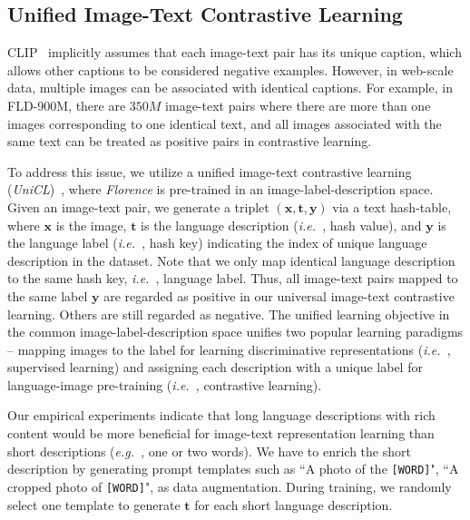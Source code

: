 \documentclass{article}
\newcommand{\eg}{{\it{e.g.}~}}
\newcommand{\ie}{{\it{i.e.}~}}
\begin{document}
\subsection{Unified Image-Text Contrastive Learning}
\label{sect:UniC}

CLIP~\cite{radford2021learning} implicitly assumes that each image-text pair has its unique caption, which allows other captions to be considered negative examples. However, in web-scale data, multiple images can be associated with identical captions. For example, in FLD-900M, there are $350M$ image-text pairs where there are more than one images corresponding to one identical text, and all images associated with the same text can be treated as positive pairs in contrastive learning.

To address this issue, we utilize a unified image-text contrastive learning
(\emph{UniCL})~\cite{Jianwei_UNICL2022}, where \emph{Florence} is pre-trained in an
image-label-description space. Given an image-text pair, we generate a triplet
$(\boldsymbol{x}, \boldsymbol{t}, \boldsymbol{y})$ via a text hash-table, where $\boldsymbol{x}$ is
the image, $\boldsymbol{t}$ is the language description (\ie, hash value), and $\boldsymbol{y}$ is
the language label (\ie, hash key) indicating the index of unique language description in the
dataset. Note that we only map identical language description to the same hash key, \ie, language
label. Thus, all image-text pairs mapped to the same label $\boldsymbol{y}$ are regarded as positive
in our universal image-text contrastive learning. Others are still regarded as negative. The unified
learning objective in the common image-label-description space unifies two popular learning
paradigms -- mapping images to the label for learning discriminative representations (\ie,
supervised learning) and assigning each description with a unique label for language-image
pre-training (\ie, contrastive learning).

Our empirical experiments indicate that long language descriptions with rich content would be more
beneficial for image-text representation learning than short descriptions (\eg, one or two words).
We have to enrich the short description by generating prompt templates such as ``A photo of the
\texttt{[WORD]}", ``A cropped photo of \texttt{[WORD]}", as data augmentation. During
training, we randomly select one template to generate $\boldsymbol{t}$ for each short language
description.
\end{document}
